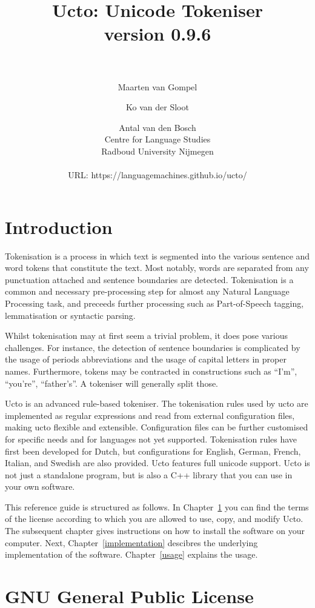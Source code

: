 \documentclass[a4paper,12pt]{report}
\author{Maarten van Gompel \and Ko van der Sloot \and Antal van den Bosch \\
        Centre for Language Studies \\
        Radboud University Nijmegen \\ \\
        URL: https://languagemachines.github.io/ucto/}
\title{{\huge Ucto: Unicode Tokeniser} \\ \vspace*{0.5cm}
{\bf version 0.9.6} \\ \vspace*{0.5cm}{\huge Reference Guide}\\
\vspace*{1cm}} %
\begin{document}

\maketitle

\tableofcontents

\chapter*{Introduction}

Tokenisation is a process in which text is segmented into the various sentence and word tokens that constitute the text. Most notably, words are separated from any punctuation attached and sentence boundaries are detected. Tokenisation is a common and necessary pre-processing step for almost any Natural Language Processing task, and preceeds further processing such as Part-of-Speech tagging, lemmatisation or syntactic parsing.

Whilst tokenisation may at first seem a trivial problem, it does pose various challenges. For instance, the detection of sentence boundaries is complicated by the usage of periods abbreviations and the usage of capital letters in proper names. Furthermore, tokens may be contracted in constructions such as ``I'm'', ``you're'', ``father's''. A tokeniser will generally split those.

Ucto is an advanced rule-based tokeniser. The tokenisation rules used by ucto are implemented as regular expressions and read from external configuration files, making ucto flexible and extensible. Configuration files can be further customised for specific needs and for languages not yet supported. Tokenisation rules have first been developed for Dutch, but configurations for English, German, French, Italian, and Swedish are also provided. Ucto features full unicode support. Ucto is not just a standalone program, but is also a C++ library that you can use in your own software.

This reference guide is structured as follows. In Chapter~\ref{license} you can find the terms of the license according to which you are allowed to use, copy, and modify Ucto. The subsequent chapter gives instructions on how to install the software on your computer.  Next, Chapter~\ref{implementation} descibres the underlying implementation of the software. Chapter~\ref{usage} explains the usage.

\chapter{GNU General Public License}
\label{license}
\end{document}
